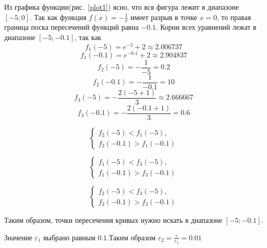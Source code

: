 \documentclass[a4paper,12pt,titlepage,finall]{article}
\begin{document}
Из графика функции(рис.~\ref{plot1}) ясно, что вся фигура лежит в диапазоне $[-5; 0]$. Так как функция $f(x) = -\frac{1}{x}$ имеет разрыв в точке $x = 0$, то правая граница поска пересечений функций равна $-0.1$. Корни всех уравнений лежат в диапазоне $[-5; -0.1]$, так как  
$$f_{1}(-5) = e^{-5}+2 \approx 2.006737 $$
$$f_{1}(-0.1) = e^{-0.1}+2 \approx 2.904837 $$
$$f_{2}(-5) = -\frac{1}{-5} = 0.2 $$
$$f_{2}(-0.1) = -\frac{1}{-0.1} = 10 $$
$$f_{3}(-5) = -\frac{2(-5+1)}{3} \approx 2.666667 $$
$$f_{3}(-0.1) = -\frac{2(-0.1+1)}{3} = 0.6 $$

\begin{equation}
 \begin{cases}
   f_{2}(-5) < f_{1}(-5), \\
   f_{2}(-0.1) > f_{1}(-0.1) 
 \end{cases}
\end{equation}

\begin{equation}
 \begin{cases}
   f_{1}(-5) < f_{3}(-5), \\
   f_{1}(-0.1) > f_{3}(-0.1) 
 \end{cases}
\end{equation}

\begin{equation}
 \begin{cases}
   f_{2}(-5) < f_{3}(-5), \\
   f_{2}(-0.1) > f_{3}(-0.1) 
 \end{cases}
\end{equation}

Таким образом, точки пересечения кривых нужно искать в диапазоне $[-5; -0.1]$.\par
Значение $\varepsilon_1$ выбрано равным $0.1$.Таким образом $\varepsilon_2 = \frac{\varepsilon}{\varepsilon_1} = 0.01$ 
\end{document}
